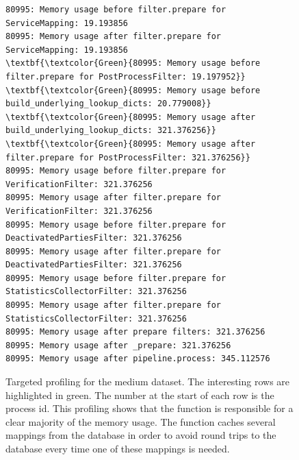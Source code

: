\begin{figure}[ht]
\begin{Verbatim}[fontsize=\tiny]
80995: Memory usage before filter.prepare for ServiceMapping: 19.193856
80995: Memory usage after filter.prepare for ServiceMapping: 19.193856
\textbf{\textcolor{Green}{80995: Memory usage before filter.prepare for PostProcessFilter: 19.197952}}
\textbf{\textcolor{Green}{80995: Memory usage before build_underlying_lookup_dicts: 20.779008}}
\textbf{\textcolor{Green}{80995: Memory usage after build_underlying_lookup_dicts: 321.376256}}
\textbf{\textcolor{Green}{80995: Memory usage after filter.prepare for PostProcessFilter: 321.376256}}
80995: Memory usage before filter.prepare for VerificationFilter: 321.376256
80995: Memory usage after filter.prepare for VerificationFilter: 321.376256
80995: Memory usage before filter.prepare for DeactivatedPartiesFilter: 321.376256
80995: Memory usage after filter.prepare for DeactivatedPartiesFilter: 321.376256
80995: Memory usage before filter.prepare for StatisticsCollectorFilter: 321.376256
80995: Memory usage after filter.prepare for StatisticsCollectorFilter: 321.376256
80995: Memory usage after prepare filters: 321.376256
80995: Memory usage after _prepare: 321.376256
80995: Memory usage after pipeline.process: 345.112576
\end{Verbatim}
\caption[Targeted memory profiling for the medium dataset]{Targeted profiling for the medium dataset. The interesting rows are highlighted in green.
The number at the start of each row is the process id.
This profiling shows that the
function  is responsible for a clear majority of the memory usage. The function caches several mappings
from the database in order to avoid round trips to the database every time one of these mappings is needed.}
\label{fig:target_profiler_medium}
\end{figure}
